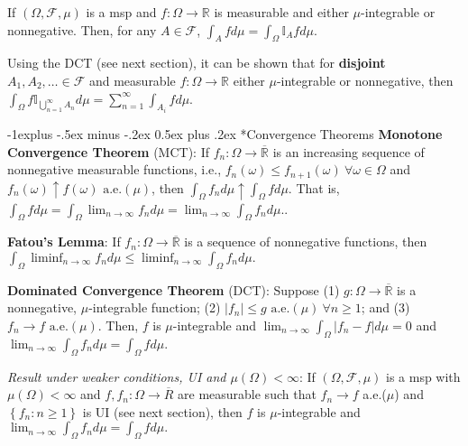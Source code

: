 \documentclass[paper=letter,fontsize=2.89mm]{scrartcl}
\makeatletter
\newcommand{\R}{\mathbb{R}}
\newcommand\indicate[1]{\mathbb{I}_{ #1 }}
\newcommand\abs[1]{\left| #1 \right|}
\newcommand\set[1]{\left\{ #1 \right\}}
\renewcommand{\subsection}{\@startsection{subsection}{2}{0mm}%
                                {-1explus -.5ex minus -.2ex}%
                                {0.5ex plus .2ex}%
                                {\normalfont\normalsize\bfseries}}
\makeatother
\begin{document}
\begin{multicols*}{3}
If $(\Omega, \mathcal{F}, \mu)$ is a msp and $f:\Omega \to \R$ is measurable and either $\mu$-integrable or nonnegative. Then, for any $A \in \mathcal{F}$, $\int_A fd\mu = \int_\Omega \indicate{A}fd\mu$. \\ \medskip

Using the DCT (see next section), it can be shown that for \textbf{disjoint} $A_1, A_2, \dots \in \mathcal{F}$ and measurable $f: \Omega \to \R$ either $\mu$-integrable or nonnegative, then 
$\int_\Omega f \indicate{\bigcup_{n=1}^\infty A_n}d\mu = \sum_{n=1}^\infty \int_{A_i} f d\mu$. \\ \medskip

\subsection*{Convergence Theorems}
\textbf{Monotone Convergence Theorem} (MCT): If $f_n: \Omega \to \overline{\R}$ is an increasing sequence of nonnegative measurable functions, i.e., $f_n(\omega) \le f_{n+1}(\omega) ~\forall \omega \in \Omega$ and $f_n(\omega) \uparrow f(\omega) \text{ a.e.}(\mu)$, then $\int_\Omega f_n d\mu \uparrow \int_\Omega f d\mu$. That is, $\int_\Omega f d\mu = \int_\Omega \lim_{n\to\infty} f_nd\mu = \lim_{n\to\infty}\int_\Omega f_nd\mu.$. \\ \medskip

\textbf{Fatou's Lemma}:
If $f_n: \Omega \to \overline{\R}$ is a sequence of nonnegative functions, then $\int_\Omega \liminf_{n\to\infty} f_n d\mu \le \liminf_{n\to\infty}  \int_\Omega f_n d\mu.$ \\ \medskip

\textbf{Dominated Convergence Theorem} (DCT): 
Suppose (1) $g: \Omega \to \overline{\R}$ is a nonnegative, $\mu$-integrable function; (2) $\abs{f_n} \le g \text{ a.e.}(\mu) ~\forall n \ge 1$; and (3) $f_n \to f \text{ a.e.}(\mu)$. Then, $f$ is $\mu$-integrable and $\lim_{n\to\infty}\int_\Omega \abs{f_n - f} d\mu = 0$ and $\lim_{n\to\infty} \int_\Omega f_nd\mu = \int_\Omega fd\mu.$ \\ \medskip

\emph{Result under weaker conditions, UI and $\mu(\Omega) < \infty$}: If $(\Omega, \mathcal{F}, \mu)$ is a msp with $\mu(\Omega) < \infty$ and $f,f_n: \Omega \to \overline{R}$ are measurable such that $f_n \to f$ a.e.($\mu$) and $\set{f_n: n \ge1}$ is UI (see next section), then $f$ is $\mu$-integrable and $\lim_{n\to\infty} \int_\Omega f_nd\mu = \int_\Omega f d\mu.$ \\ \medskip


\end{multicols*}
\end{document}
